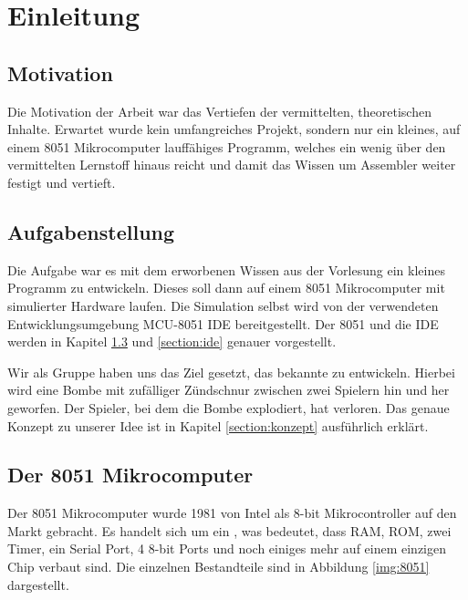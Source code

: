 \chapter{Einleitung}

\section{Motivation}

\lipsum

Die Motivation der Arbeit war das Vertiefen der vermittelten, theoretischen Inhalte. Erwartet wurde kein umfangreiches Projekt, sondern nur ein kleines, auf einem 8051 Mikrocomputer lauffähiges Programm, welches ein wenig über den vermittelten Lernstoff hinaus reicht und damit das Wissen um Assembler\cite{bib:assembler} weiter festigt und vertieft.

\section{Aufgabenstellung}

Die Aufgabe war es mit dem erworbenen Wissen aus der Vorlesung  ein kleines Programm zu entwickeln. Dieses soll dann auf einem 8051 Mikrocomputer mit simulierter Hardware laufen. Die Simulation selbst wird von der verwendeten Entwicklungsumgebung MCU-8051 IDE bereitgestellt. Der 8051 und die IDE werden in Kapitel \ref{section:8051} und \ref{section:ide} genauer vorgestellt.

Wir als Gruppe haben uns das Ziel gesetzt, das bekannte  zu entwickeln. Hierbei wird eine Bombe mit zufälliger Zündschnur zwischen zwei Spielern hin und her geworfen. Der Spieler, bei dem die Bombe explodiert, hat verloren. Das genaue Konzept zu unserer Idee ist in Kapitel \ref{section:konzept} ausführlich erklärt.

\section{Der 8051 Mikrocomputer} \label{section:8051}

Der 8051 Mikrocomputer wurde 1981 von Intel als 8-bit Mikrocontroller auf den Markt gebracht. Es handelt sich um ein , was bedeutet, dass RAM, ROM, zwei Timer, ein Serial Port, 4 8-bit Ports und noch einiges mehr auf einem einzigen Chip verbaut sind. Die einzelnen Bestandteile sind in Abbildung \ref{img:8051} dargestellt.\cite{bib:8051}

